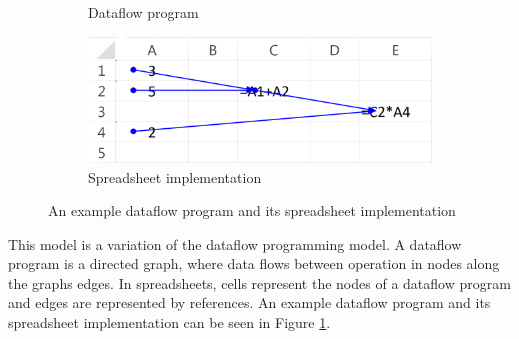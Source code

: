 \begin{figure}
\centerfloat
\begin{subfigure}[b]{0.45\textwidth}
\centering
{}
\caption{Dataflow program}
\end{subfigure}
\hspace{0.05\textwidth}
\begin{subfigure}[b]{0.45\textwidth}
\includegraphics[width=\textwidth]{anatomy/dataflow-program-excel-implementation}
\caption{Spreadsheet implementation}
\end{subfigure}
\caption{An example dataflow program and its spreadsheet implementation}
\label{fig:dataflow-example}
\end{figure}

This model is a variation of the dataflow programming model.
A dataflow program is a directed graph, where data flows between operation in nodes along the graphs edges.
In spreadsheets, cells represent the nodes of a dataflow program and edges are represented by references.
An example dataflow program and its spreadsheet implementation can be seen in Figure \ref{fig:dataflow-example}.

